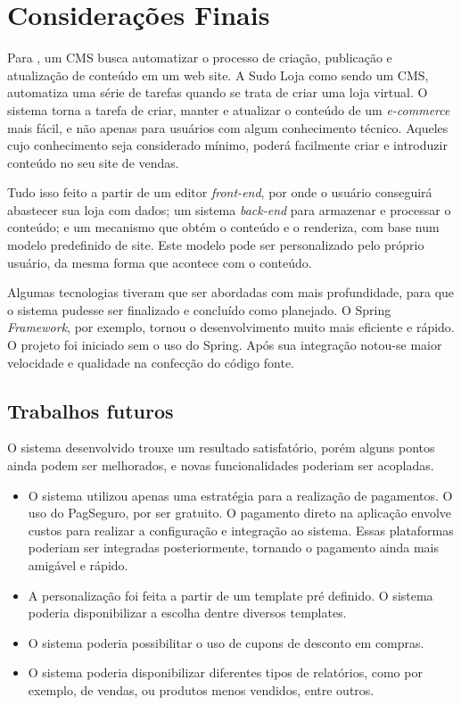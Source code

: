 \documentclass[a4paper,12pt]{monografia}
\begin{document}
\chapter{Considerações Finais} %
\label{cha:considera_es_finais}

Para , um CMS busca automatizar o processo de criação, publicação e atualização de conteúdo em um web site. A Sudo Loja como sendo um CMS, automatiza uma série de tarefas quando se trata de criar uma loja virtual. O sistema torna a tarefa de criar, manter e atualizar o conteúdo de um \textit{e-commerce} mais fácil, e não apenas para usuários com algum conhecimento técnico. Aqueles cujo conhecimento seja considerado mínimo, poderá facilmente criar e introduzir conteúdo no seu site de vendas. 

Tudo isso feito a partir de um editor \textit{front-end}, por onde o usuário conseguirá abastecer sua loja com dados; um sistema \textit{back-end} para armazenar e processar o conteúdo; e um mecanismo que obtém o conteúdo e o renderiza, com base num modelo predefinido de site. Este modelo pode ser personalizado pelo próprio usuário, da mesma forma que acontece com o conteúdo.

Algumas tecnologias tiveram que ser abordadas com mais profundidade, para que o sistema pudesse ser finalizado e concluído como planejado. O Spring \textit{Framework}, por exemplo, tornou o desenvolvimento muito mais eficiente e rápido. O projeto foi iniciado sem o uso do Spring. Após sua integração notou-se maior velocidade e qualidade na confecção do código fonte.

\section{Trabalhos futuros} %
\label{sec:trabalhos_futuros}

O sistema desenvolvido trouxe um resultado satisfatório, porém alguns pontos ainda podem ser melhorados, e  novas funcionalidades poderiam ser acopladas.

\begin{itemize}
	\item O sistema utilizou apenas uma estratégia para a realização de pagamentos. O uso do PagSeguro, por ser gratuito. O pagamento direto na aplicação envolve custos para realizar a configuração e integração ao sistema. Essas plataformas poderiam ser integradas posteriormente, tornando o pagamento ainda mais amigável e rápido.
	\item A personalização foi feita a partir de um template pré definido. O sistema poderia disponibilizar a escolha dentre diversos templates.
	\item O sistema poderia possibilitar o uso de cupons de desconto em compras.
	\item O sistema poderia disponibilizar diferentes tipos de relatórios, como por exemplo, de vendas, ou produtos menos vendidos, entre outros.
\end{itemize}
\end{document}
